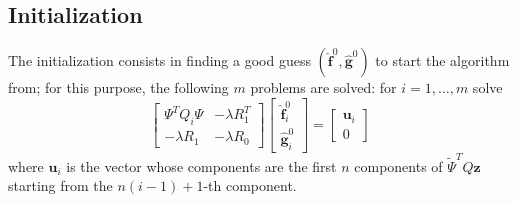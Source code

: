 \subsection{Initialization}
The initialization consists in finding a good guess
$(\hat{\bm{f}}^0,\hat{\bm{g}}^0)$ to start the algorithm from; for this
purpose, the following $m$ problems are solved: for $i = 1, \dots, m$ solve
\begin{equation}
	\begin{bmatrix}
		\Psi^TQ_i\Psi & -\lambda R_1^T \\
		-\lambda R_1  & -\lambda R_0
	\end{bmatrix}
	\begin{bmatrix}
		\hat{\bm{f}}_i^0 \\
		\hat{\bm{g}}_i^0
	\end{bmatrix}
	=
	\begin{bmatrix}
		\bm{u}_i \\
		0
	\end{bmatrix}
\end{equation}
where $\bm{u}_i$ is the vector whose components are the first $n$
components of $\tilde{\Psi}^T Q\bm{z}$ starting from the $n(i-1) +1$-th
component.

